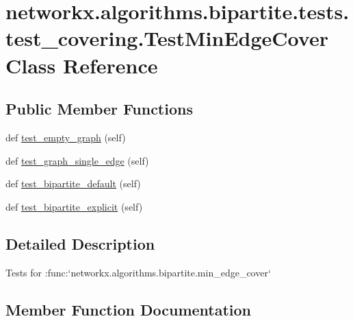 \hypertarget{classnetworkx_1_1algorithms_1_1bipartite_1_1tests_1_1test__covering_1_1TestMinEdgeCover}{}\section{networkx.\+algorithms.\+bipartite.\+tests.\+test\+\_\+covering.\+Test\+Min\+Edge\+Cover Class Reference}
\label{classnetworkx_1_1algorithms_1_1bipartite_1_1tests_1_1test__covering_1_1TestMinEdgeCover}
\subsection*{Public Member Functions}
\begin{DoxyCompactItemize}
\item 
def \hyperlink{classnetworkx_1_1algorithms_1_1bipartite_1_1tests_1_1test__covering_1_1TestMinEdgeCover_a246a2a80400436e37df738084eec0c16}{test\+\_\+empty\+\_\+graph} (self)
\item 
def \hyperlink{classnetworkx_1_1algorithms_1_1bipartite_1_1tests_1_1test__covering_1_1TestMinEdgeCover_a5fbfbe9a9518ce4a3f1a5e41b22c2c12}{test\+\_\+graph\+\_\+single\+\_\+edge} (self)
\item 
def \hyperlink{classnetworkx_1_1algorithms_1_1bipartite_1_1tests_1_1test__covering_1_1TestMinEdgeCover_a77d9218dbdf50227514e6aba47ea3861}{test\+\_\+bipartite\+\_\+default} (self)
\item 
def \hyperlink{classnetworkx_1_1algorithms_1_1bipartite_1_1tests_1_1test__covering_1_1TestMinEdgeCover_aea95db4a4de596275a388b6c0f171508}{test\+\_\+bipartite\+\_\+explicit} (self)
\end{DoxyCompactItemize}


\subsection{Detailed Description}
\begin{DoxyVerb}Tests for :func:`networkx.algorithms.bipartite.min_edge_cover`\end{DoxyVerb}
 

\subsection{Member Function Documentation}
\mbox{\label{classnetworkx_1_1algorithms_1_1bipartite_1_1tests_1_1test__covering_1_1TestMinEdgeCover_a77d9218dbdf50227514e6aba47ea3861}} 
